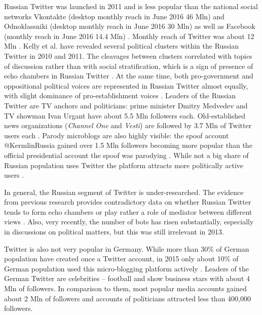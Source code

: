 Russian Twitter was launched in 2011 and is less popular than the national social networks Vkontakte (desktop monthly reach in June 2016 46 Mln) and Odnoklassniki (desktop monthly reach in June 2016 30 Mln) \cite{TNSWebIndex2016} as well as Facebook (monthly reach in June 2016 14.4 Mln) \cite{Frolova}. Monthly reach of Twitter was about 12 Mln \cite{Frolova,BrandAnalytics}. Kelly et al. have revealed several political clusters within the Russian Twitter in 2010 and 2011. The cleavages between clusters correlated with topics of discussion rather than with social stratification, which is a sign of presence of echo chambers in Russian Twitter \cite{KellyBarashAlexanyan}. At the same time, both pro-government and oppositional political voices are represented in Russian Twitter almost equally, with slight dominance of pro-establishment voices \cite{Greene,NikiporetsTakigawa}. Leaders of the Russian Twitter are TV anchors and politicians: prime minister Dmitry Medvedev and TV showman Ivan Urgant have about 5.5 Mln followers each. Old-established news organizations (\textit{Channel One} and \textit{Vesti}) are followed by 3.7 Mln of Twitter users each \cite{SocialBakers}. Parody microblogs are also highly visible: the spoof account @KermlinRussia gained over 1.5 Mln followers becoming more popular than the official presidential account the spoof was parodying \cite{Denisova2017}. While not a big share of Russian population uses Twitter the platform attracts more politically active users \cite{BodrunovaLitvinenko2013,BodrunovaLitvinenko2015}.

In general, the Russian segment of Twitter is under-researched. The evidence from previous research provides contradictory data on whether Russian Twitter tends to form echo chambers \cite{KellyBarashAlexanyan} or play rather a role of mediator between different views \cite{BodrunovaLitvinenko2013,BodrunovaLitvinenko2015,BarashKelly}. Also, very recently, the number of bots has risen substantially, especially in discussions on political matters, but this was still irrelevant in 2013.

Twitter is also not very popular in Germany. While more than 30\% of German population have created once a Twitter account, in 2015 only about 10\% of German population used this micro-blogging platform actively \cite{MoscaQuaranta}. Leaders of the German Twitter are celebrities -- football and show business stars with about 4 Mln of followers. In comparison to them, most popular media accounts gained about 2 Mln of followers and accounts of politicians attracted less than 400,000 followers.

